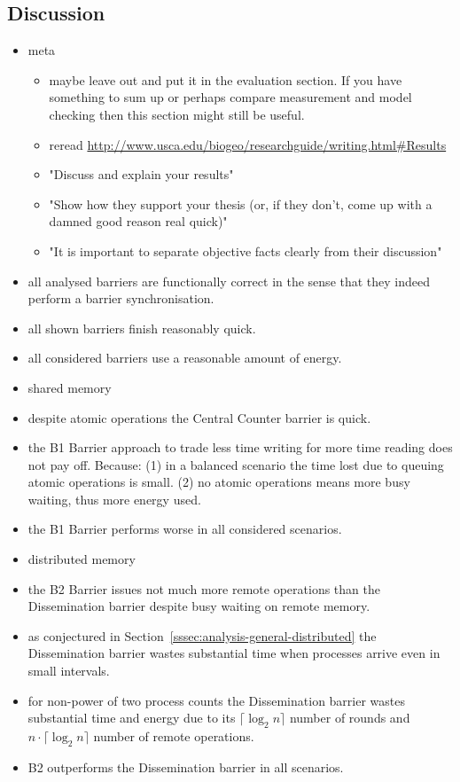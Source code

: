 \documentclass[a4paper, 10pt]{article}
\begin{document}
\subsection{Discussion}
\label{ssec:analysis-discussion}
\begin{itemize}
	\item meta
		\begin{itemize}
			\item maybe leave out and put it in the evaluation section. If you have something to sum up or perhaps compare measurement and model checking then this section might still be useful.
			\item reread \url{http://www.usca.edu/biogeo/researchguide/writing.html#Results}
			\item "Discuss and explain your results"
			\item "Show how they support your thesis (or, if they don't, come up with a damned good reason real quick)"
			\item "It is important to separate objective facts clearly from their discussion"
		\end{itemize}

	\item all analysed barriers are functionally correct in the sense that they indeed perform a barrier synchronisation.
	\item all shown barriers finish reasonably quick.
	\item all considered barriers use a reasonable amount of energy.

	\item shared memory
	\item despite atomic operations the Central Counter barrier is quick.
	\item the B1 Barrier approach to trade less time writing for more time reading does not pay off. Because: (1) in a balanced scenario the time lost due to queuing atomic operations is small. (2) no atomic operations means more busy waiting, thus more energy used.
	\item the B1 Barrier performs worse in all considered scenarios.

	\item distributed memory
	\item the B2 Barrier issues not much more remote operations than the Dissemination barrier despite busy waiting on remote memory.
	\item as conjectured in Section~\ref{sssec:analysis-general-distributed} the Dissemination barrier wastes substantial time when processes arrive even in small intervals.
	\item for non-power of two process counts the Dissemination barrier wastes substantial time and energy due to its $\lceil \log_2 n \rceil$ number of rounds and $n \cdot \lceil \log_2 n \rceil$ number of remote operations.
	\item B2 outperforms the Dissemination barrier in all scenarios.


\end{itemize}
\end{document}
